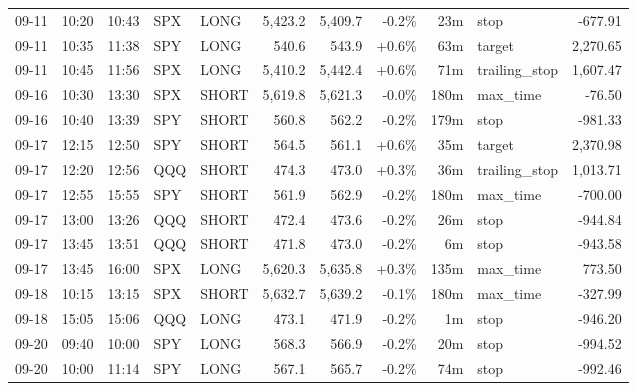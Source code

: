 \documentclass[11pt,a4paper,twoside]{article}
\begin{document}
\begin{center}
\begin{longtable}{>{\color{txtmain}}l l l l l r r r r >{\color{txtmain}}l r}
09-11 & 10:20 & 10:43 & SPX & LONG & 5,423.2 & 5,409.7 & \textcolor{lossred}{-0.2\%} & 23m & stop & \textcolor{lossred}{-677.91} \\
09-11 & 10:35 & 11:38 & SPY & LONG & 540.6 & 543.9 & \textcolor{wingreen}{+0.6\%} & 63m & target & \textcolor{wingreen}{2,270.65} \\
09-11 & 10:45 & 11:56 & SPX & LONG & 5,410.2 & 5,442.4 & \textcolor{wingreen}{+0.6\%} & 71m & trailing\_stop & \textcolor{wingreen}{1,607.47} \\
09-16 & 10:30 & 13:30 & SPX & SHORT & 5,619.8 & 5,621.3 & \textcolor{lossred}{-0.0\%} & 180m & max\_time & \textcolor{lossred}{-76.50} \\
09-16 & 10:40 & 13:39 & SPY & SHORT & 560.8 & 562.2 & \textcolor{lossred}{-0.2\%} & 179m & stop & \textcolor{lossred}{-981.33} \\
09-17 & 12:15 & 12:50 & SPY & SHORT & 564.5 & 561.1 & \textcolor{wingreen}{+0.6\%} & 35m & target & \textcolor{wingreen}{2,370.98} \\
09-17 & 12:20 & 12:56 & QQQ & SHORT & 474.3 & 473.0 & \textcolor{wingreen}{+0.3\%} & 36m & trailing\_stop & \textcolor{wingreen}{1,013.71} \\
09-17 & 12:55 & 15:55 & SPY & SHORT & 561.9 & 562.9 & \textcolor{lossred}{-0.2\%} & 180m & max\_time & \textcolor{lossred}{-700.00} \\
09-17 & 13:00 & 13:26 & QQQ & SHORT & 472.4 & 473.6 & \textcolor{lossred}{-0.2\%} & 26m & stop & \textcolor{lossred}{-944.84} \\
09-17 & 13:45 & 13:51 & QQQ & SHORT & 471.8 & 473.0 & \textcolor{lossred}{-0.2\%} & 6m & stop & \textcolor{lossred}{-943.58} \\
09-17 & 13:45 & 16:00 & SPX & LONG & 5,620.3 & 5,635.8 & \textcolor{wingreen}{+0.3\%} & 135m & max\_time & \textcolor{wingreen}{773.50} \\
09-18 & 10:15 & 13:15 & SPX & SHORT & 5,632.7 & 5,639.2 & \textcolor{lossred}{-0.1\%} & 180m & max\_time & \textcolor{lossred}{-327.99} \\
09-18 & 15:05 & 15:06 & QQQ & LONG & 473.1 & 471.9 & \textcolor{lossred}{-0.2\%} & 1m & stop & \textcolor{lossred}{-946.20} \\
09-20 & 09:40 & 10:00 & SPY & LONG & 568.3 & 566.9 & \textcolor{lossred}{-0.2\%} & 20m & stop & \textcolor{lossred}{-994.52} \\
09-20 & 10:00 & 11:14 & SPY & LONG & 567.1 & 565.7 & \textcolor{lossred}{-0.2\%} & 74m & stop & \textcolor{lossred}{-992.46} \\

\end{longtable}
\end{center}
\end{document}
